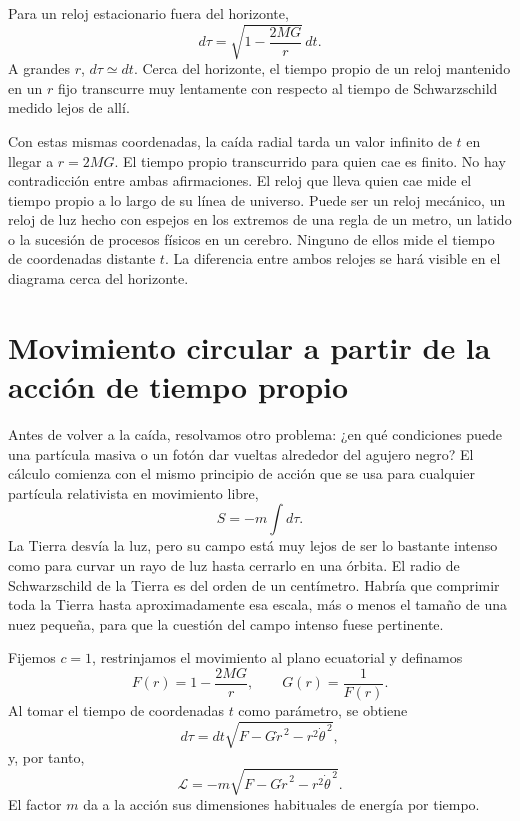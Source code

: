 Para un reloj estacionario fuera del horizonte,
\begin{equation}
d\tau
=
\sqrt{1-\frac{2MG}{r}}\,dt.
\label{eq:l6-static-clock}
\end{equation}
A grandes \(r\), \(d\tau\simeq dt\). Cerca del horizonte, el tiempo propio de un reloj mantenido en un \(r\) fijo transcurre muy lentamente con respecto al tiempo de Schwarzschild medido lejos de allí.

Con estas mismas coordenadas, la caída radial tarda un valor infinito de \(t\) en llegar a \(r=2MG\). El tiempo propio transcurrido para quien cae es finito. No hay contradicción entre ambas afirmaciones. El reloj que lleva quien cae mide el tiempo propio a lo largo de su línea de universo. Puede ser un reloj mecánico, un reloj de luz hecho con espejos en los extremos de una regla de un metro, un latido o la sucesión de procesos físicos en un cerebro. Ninguno de ellos mide el tiempo de coordenadas distante \(t\). La diferencia entre ambos relojes se hará visible en el diagrama cerca del horizonte.

\section{Movimiento circular a partir de la acción de tiempo propio}

Antes de volver a la caída, resolvamos otro problema: ¿en qué condiciones puede una partícula masiva o un fotón dar vueltas alrededor del agujero negro? El cálculo comienza con el mismo principio de acción que se usa para cualquier partícula relativista en movimiento libre,
\begin{equation}
S=-m\int d\tau.
\label{eq:l6-particle-action}
\end{equation}
La Tierra desvía la luz, pero su campo está muy lejos de ser lo bastante intenso como para curvar un rayo de luz hasta cerrarlo en una órbita. El radio de Schwarzschild de la Tierra es del orden de un centímetro. Habría que comprimir toda la Tierra hasta aproximadamente esa escala, más o menos el tamaño de una nuez pequeña, para que la cuestión del campo intenso fuese pertinente.

Fijemos \(c=1\), restrinjamos el movimiento al plano ecuatorial y definamos
\begin{equation}
F(r)=1-\frac{2MG}{r},
\qquad
G(r)=\frac{1}{F(r)}.
\label{eq:l6-fg}
\end{equation}
Al tomar el tiempo de coordenadas \(t\) como parámetro, se obtiene
\begin{equation}
d\tau
=dt\sqrt{F-G\dot r^{\,2}-r^{2}\dot\theta^{\,2}},
\end{equation}
y, por tanto,
\begin{equation}
\mathcal L
=
-m\sqrt{F-G\dot r^{\,2}-r^{2}\dot\theta^{\,2}}.
\label{eq:l6-lagrangian}
\end{equation}
El factor \(m\) da a la acción sus dimensiones habituales de energía por tiempo.

